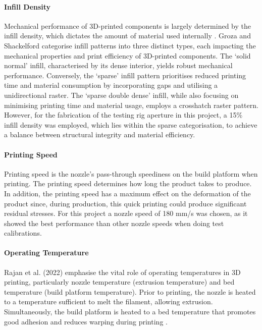 \paragraph{Infill Density}

Mechanical performance of 3D-printed components is largely determined by the infill density, which dictates the amount of material used internally \cite{RefWorks:RefID:89-rajan2022fused}.
Groza and Shackelford \cite{srivatsan2012materials} categorise infill patterns into three distinct types, each impacting the mechanical properties and print efficiency of 3D-printed components. 
The `solid normal' infill, characterised by its dense interior, yields robust mechanical performance. 
Conversely, the `sparse' infill pattern prioritises reduced printing time and material consumption by incorporating gaps and utilising a unidirectional raster. 
The `sparse double dense' infill, while also focusing on minimising printing time and material usage, employs a crosshatch raster pattern. 
However, for the fabrication of the testing rig aperture in this project, a 15\% infill density was employed, which lies within the sparse categorisation, to achieve a balance between structural integrity and material efficiency.

 \paragraph{Printing Speed}

 Printing speed is the nozzle's pass-through speediness on the build platform when printing. 
 The printing speed determines how long the product takes to produce. 
 In addition, the printing speed has a maximum effect on the deformation of the product since, during production, this quick printing could produce significant residual stresses\cite{RefWorks:RefID:89-rajan2022fused}. 
 For this project a nozzle speed of 180 mm/s was chosen, as it showed the best performance than other nozzle speeds when doing test calibrations. 

\paragraph{Operating Temperature}

Rajan et al. (2022) emphasise the vital role of operating temperatures in 3D printing, particularly nozzle temperature (extrusion temperature) and bed temperature (build platform temperature). 
Prior to printing, the nozzle is heated to a temperature sufficient to melt the filament, allowing extrusion. 
Simultaneously, the build platform is heated to a bed temperature that promotes good adhesion and reduces warping during printing \cite{RefWorks:RefID:89-rajan2022fused}.

